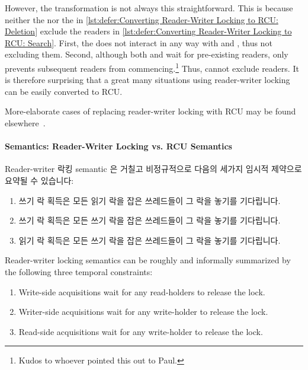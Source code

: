 However, the transformation is not always this straightforward.
This is because neither the  nor the
 in
\cref{lst:defer:Converting Reader-Writer Locking to RCU: Deletion}
exclude the readers in
\cref{lst:defer:Converting Reader-Writer Locking to RCU: Search}.
First, the  does not interact in any way with
 and , thus not excluding them.
Second, although both  and 
wait for pre-existing readers, only  prevents
subsequent readers from commencing.\footnote{
	Kudos to whoever pointed this out to Paul.}
Thus,  cannot exclude readers.
It is therefore surprising that a great many situations
using reader-writer locking can be easily converted to RCU\@.

More-elaborate cases of replacing reader-writer locking with RCU
may be found
elsewhere~\cite{NeilBrown2015PathnameLookup,NeilBrown2015RCUwalk}.

\fi

\paragraph{Semantics: Reader-Writer Locking vs. RCU Semantics}

Reader-writer 락킹 semantic 은 거칠고 비정규적으로 다음의 세가지 임시적 제약으로
요약될 수 있습니다:

\begin{enumerate}
\item	쓰기 락 획득은 모든 읽기 락을 잡은 쓰레드들이 그 락을 놓기를
	기다립니다.
\item	쓰기 락 획득은 모든 쓰기 락을 잡은 쓰레드들이 그 락을 놓기를
	기다립니다.
\item	읽기 락 획득은 모든 쓰기 락을 잡은 쓰레드들이 그 락을 놓기를
	기다립니다.
\end{enumerate}

\iffalse

Reader-writer locking semantics can be roughly and informally summarized
by the following three temporal constraints:

\begin{enumerate}
\item	Write-side acquisitions wait for any read-holders to release
	the lock.
\item	Writer-side acquisitions wait for any write-holder to release
	the lock.
\item	Read-side acquisitions wait for any write-holder to release
	the lock.
\end{enumerate}

